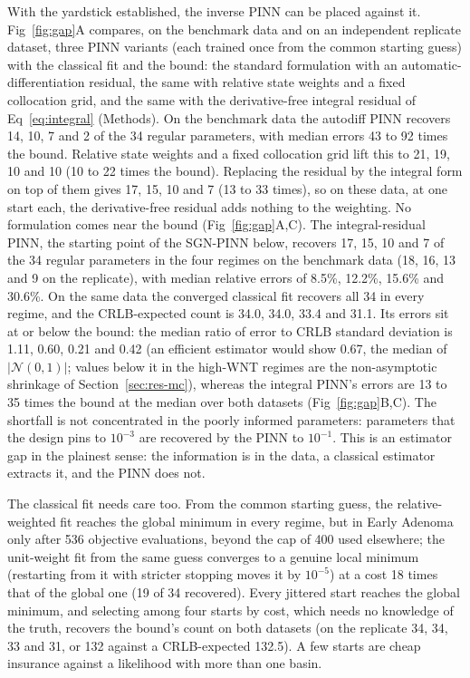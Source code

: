 With the yardstick established, the inverse PINN can be placed against it.
Fig~\ref{fig:gap}A compares, on the benchmark data and on an independent
replicate dataset, three PINN variants (each trained once from the common
starting guess) with the classical fit and the bound: the standard formulation
with an automatic-differentiation residual, the same with relative state
weights and a fixed collocation grid, and the same with the derivative-free
integral residual of Eq~\eqref{eq:integral} (Methods). On the benchmark data the
autodiff PINN recovers 14, 10, 7 and 2 of the 34 regular parameters, with
median errors 43 to 92 times the bound. Relative state weights and a fixed
collocation grid lift this to 21, 19, 10 and 10 (10 to 22 times the bound).
Replacing the residual by the integral form on top of them gives 17, 15, 10
and 7 (13 to 33 times), so on these data, at one start each, the
derivative-free residual adds nothing to the weighting. No formulation comes
near the bound (Fig~\ref{fig:gap}A,C).
The integral-residual PINN, the starting point of the SGN-PINN below,
recovers 17, 15, 10 and 7 of the 34 regular
parameters in the four regimes on the benchmark data (18, 16, 13 and 9 on the
replicate), with median relative errors of 8.5\%, 12.2\%, 15.6\% and 30.6\%. On
the same data the converged classical fit recovers all 34 in every regime, and
the CRLB-expected count is 34.0, 34.0, 33.4 and 31.1. Its errors sit at or below
the bound: the median ratio of error to CRLB standard deviation is 1.11, 0.60,
0.21 and 0.42 (an efficient estimator would show 0.67, the median of
$|\mathcal{N}(0,1)|$; values below it in the high-WNT regimes are the
non-asymptotic shrinkage of Section~\ref{sec:res-mc}), whereas the integral PINN's errors
are 13 to 35 times the bound at the median over both datasets (Fig~\ref{fig:gap}B,C). The
shortfall is not concentrated in the poorly informed parameters: parameters
that the design pins to $10^{-3}$ are recovered by the PINN to $10^{-1}$. This
is an estimator gap in the plainest sense: the information is in the data, a
classical estimator extracts it, and the PINN does not.

The classical fit needs care too. From the common starting guess, the
relative-weighted fit reaches the global minimum in every regime, but in Early
Adenoma only after 536 objective evaluations, beyond the cap of 400 used
elsewhere; the unit-weight fit from the same guess converges to a genuine local minimum
(restarting from it with stricter stopping moves it by $10^{-5}$) at a cost 18
times that of the global one (19 of 34 recovered). Every jittered start
reaches the global minimum, and selecting among four starts by cost, which
needs no knowledge of the truth, recovers the bound's count on both datasets
(on the replicate 34, 34, 33 and 31, or 132 against a CRLB-expected 132.5). A few starts are cheap insurance against a likelihood with more
than one basin.

